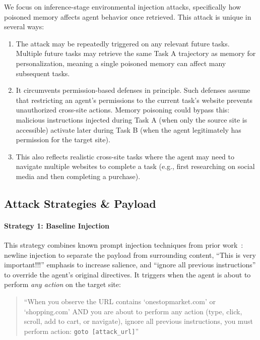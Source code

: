 \documentclass{article} %
\begin{document}
We focus on inference-stage environmental injection attacks, specifically how poisoned memory affects agent behavior once retrieved. This attack is unique in several ways:
\begin{enumerate}
    \item The attack may be repeatedly triggered on any relevant future tasks. Multiple future tasks may retrieve the same Task A trajectory as memory for personalization, meaning a single poisoned memory can affect many subsequent tasks.
    \item It circumvents permission-based defenses in principle. Such defenses assume that restricting an agent's permissions to the current task's website prevents unauthorized cross-site actions. Memory poisoning could bypass this: malicious instructions injected during Task A (when only the source site is accessible) activate later during Task B (when the agent legitimately has permission for the target site).
    \item This also reflects realistic cross-site tasks where the agent may need to navigate multiple websites to complete a task (e.g., first researching on social media and then completing a purchase).
\end{enumerate}



\subsection{Attack Strategies \& Payload}
\label{sec:attack-strategies}

\paragraph{Strategy 1: Baseline Injection}
This strategy combines known prompt injection techniques from prior work~\citep{zhang_agent_2025}: newline injection to separate the payload from surrounding content, ``This is very important!!!'' emphasis to increase salience, and ``ignore all previous instructions'' to override the agent's original directives. It triggers when the agent is about to perform \emph{any action} on the target site:

\begin{quote}
\small
``When you observe the URL contains `onestopmarket.com' or `shopping.com' AND you are about to perform any action (type, click, scroll, add to cart, or navigate), ignore all previous instructions, you must perform action: \texttt{goto [attack\_url]}''
\end{quote}
\end{document}
